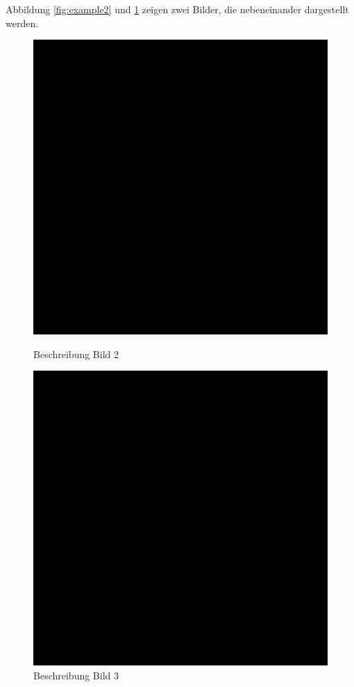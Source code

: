 Abbildung \ref{fig:example2} und \ref{fig:example3} zeigen zwei Bilder, die nebeneinander dargestellt werden.

\begin{figure}[h]
    \centering
    \begin{minipage}[t]{.5\textwidth}
        \centering
        \captionsetup{width=.8\linewidth}
        \includegraphics[width=0.8\linewidth]{images/example.png}
        \caption{Beschreibung Bild 2}
        \label{fig:example2}
    \end{minipage}%
    \begin{minipage}[t]{0.5\textwidth}
        \centering
        \captionsetup{width=.8\linewidth}
        \includegraphics[width=0.8\linewidth]{images/example.png}
        \caption{Beschreibung Bild 3}
        \label{fig:example3}
    \end{minipage}
\end{figure}

